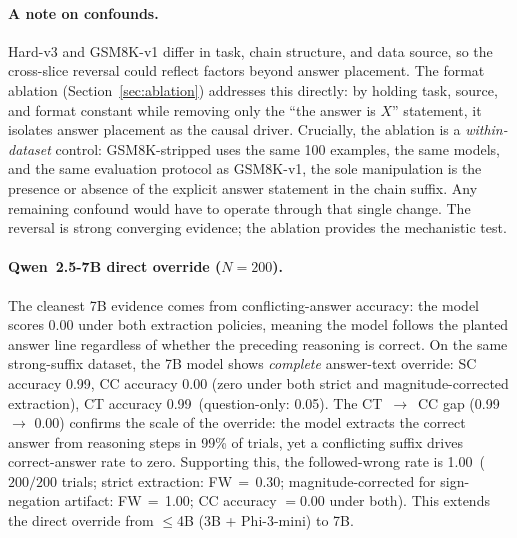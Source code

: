 \documentclass{article}
\theoremstyle{definition}
\theoremstyle{definition}
\newcommand{\SBSCACC}{0.99}
\newcommand{\SBCCACC}{0.00}
\newcommand{\SBCCFW}{1.00}
\newcommand{\SBQOACC}{0.05}
\newcommand{\SBCTACC}{0.99}
\newcommand{\SBN}{200}
\begin{document}
\paragraph{A note on confounds.}
Hard-v3 and GSM8K-v1 differ in task, chain structure, and data source,
so the cross-slice reversal could reflect factors beyond answer placement.
The format ablation (Section~\ref{sec:ablation}) addresses this directly:
by holding task, source, and format constant while removing only the
``the answer is $X$'' statement, it isolates answer placement as the
causal driver. Crucially, the ablation is a \emph{within-dataset} control:
GSM8K-stripped uses the same 100 examples, the same models,
and the same evaluation protocol as GSM8K-v1, the sole manipulation is
the presence or absence of the explicit answer statement in the chain
suffix. Any remaining confound would have to operate through that single
change. The reversal is strong converging evidence; the ablation
provides the mechanistic test.

\paragraph{Qwen~2.5-7B direct override ($N{=}\SBN$).}
The cleanest 7B evidence comes from conflicting-answer accuracy: the model
scores 0.00 under both extraction policies, meaning the model follows the
planted answer line regardless of whether the preceding reasoning is correct.
On the same strong-suffix dataset, the 7B model shows \emph{complete}
answer-text override: SC accuracy \SBSCACC, CC accuracy \SBCCACC{} (zero under
both strict and magnitude-corrected extraction), CT accuracy \SBCTACC\
(question-only: \SBQOACC).
The CT~$\to$~CC gap (\SBCTACC\ $\to$ \SBCCACC) confirms the scale of the
override: the model extracts the correct answer from reasoning steps in 99\%
of trials, yet a conflicting suffix drives correct-answer rate to zero.
Supporting this, the followed-wrong rate is \SBCCFW\ ($\SBN/\SBN$ trials;
strict extraction: FW$\,{=}\,0.30$; magnitude-corrected for sign-negation
artifact: FW$\,{=}\,$\SBCCFW; CC accuracy $=0.00$ under both).
This extends the direct override from $\leq$4B (3B + Phi-3-mini) to 7B.
\end{document}
